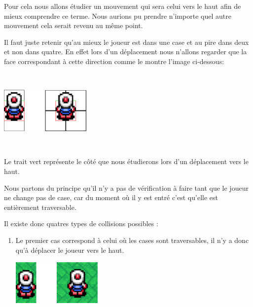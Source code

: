 {\begin{enumerate}
				  		
				  		Pour cela nous allons étudier un mouvement qui sera celui vers le haut
				  		afin de mieux comprendre ce terme.
				  		Nous aurions pu prendre n'importe quel autre mouvement cela serait
				  		revenu au même point.
				  		
				  		Il faut juste retenir qu'au mieux le joueur est dans une case et au pire
				  		dans deux et non dans quatre. En effet lors d'un déplacement nous
				  		n'allons regarder que la face correspondant à cette direction comme le montre
				  		l'image ci-dessous:
				  		
				  		$\,$
				  		
						\begin{center}						
							\includegraphics[width=168px,height=84px]{Developpement/Img/ex2.eps}
						\end{center}
						
				  		$\,$				  		
				  		
				  		Le trait vert représente le côté que nous étudierons lors d'un
				  		déplacement vers le haut.
				  		
				  		
				  		Nous partons du principe qu'il n'y a pas de vérification à faire tant
				  		que le joueur ne change pas de case, car du moment où il y est entré
				  		c'est qu'elle est entièrement traversable.
				  		
				  		Il existe donc quatres types de collisions possibles :
				  		
				  		\begin{enumerate}

				  		  \item Le premier cas correspond à celui où les cases sont
				  		  traversables, il n'y a donc qu'à déplacer le joueur vers le haut.

							\begin{center}						
								\includegraphics[width=168px,height=84px]{Developpement/Img/ok2.eps}
							\end{center}


\end{enumerate}
\end{enumerate}}
